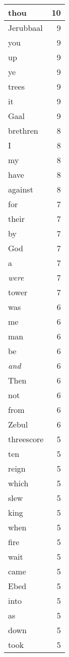 \begin{center}
\begin{longtable}{l|r}
thou & 10\\ \hline 
Jerubbaal & 9\\ \hline 
you & 9\\ \hline 
up & 9\\ \hline 
ye & 9\\ \hline 
trees & 9\\ \hline 
it & 9\\ \hline 
Gaal & 9\\ \hline 
brethren & 8\\ \hline 
I & 8\\ \hline 
my & 8\\ \hline 
have & 8\\ \hline 
against & 8\\ \hline 
for & 7\\ \hline 
their & 7\\ \hline 
by & 7\\ \hline 
God & 7\\ \hline 
a & 7\\ \hline 
\emph{were} & 7\\ \hline 
tower & 7\\ \hline 
was & 6\\ \hline 
me & 6\\ \hline 
man & 6\\ \hline 
be & 6\\ \hline 
\emph{and} & 6\\ \hline 
Then & 6\\ \hline 
not & 6\\ \hline 
from & 6\\ \hline 
Zebul & 6\\ \hline 
threescore & 5\\ \hline 
ten & 5\\ \hline 
reign & 5\\ \hline 
which & 5\\ \hline 
slew & 5\\ \hline 
king & 5\\ \hline 
when & 5\\ \hline 
fire & 5\\ \hline 
wait & 5\\ \hline 
came & 5\\ \hline 
Ebed & 5\\ \hline 
into & 5\\ \hline 
as & 5\\ \hline 
down & 5\\ \hline 
took & 5\\ \hline 

\end{longtable}
\end{center}
